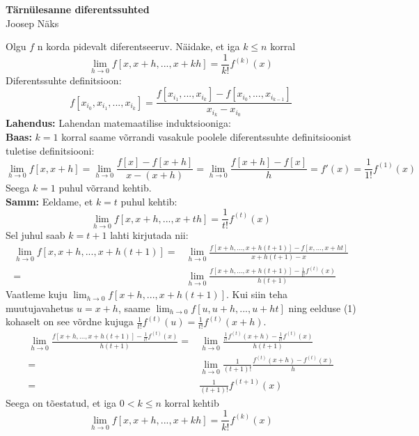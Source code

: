 \documentclass{article}
\begin{document}
\begin{center}
\Large\textbf{T\"arn\"ulesanne diferentssuhted}\\
\small{Joosep N\"aks}
\end{center}
Olgu $f$ n korda pidevalt diferentseeruv. N\"aidake, et iga $k\leq n$ korral\\
\begin {equation*}
\lim_{h\to0} f[x,x+h,...,x+kh]=\frac{1}{k!}f^{(k)}(x)
\end{equation*}
Diferentssuhte definitsioon:
\begin{equation*}
f[x_{i_0},x_{i_1},...,x_{i_k}]=\frac{f[x_{i_1},...,x_{i_k}]-f[x_{i_0},...,x_{i_{k-1}}]}{x_{i_k}-x_{i_0}}
\end{equation*}
\textbf{Lahendus:} Lahendan matemaatilise induktsiooniga:\\
\textbf{Baas:} $k=1$ korral saame v\~orrandi vasakule poolele diferentssuhte definitsioonist tuletise definitsiooni:
\begin{equation*}
\lim_{h\to0} f[x,x+h]=\lim_{h\to0}\frac{f[x]-f[x+h]}{x-(x+h)}=\lim_{h\to0}\frac{f[x+h]-f[x]}{h}=f'(x)=\frac{1}{1!}f^{(1)}(x)
\end{equation*}
Seega $k=1$ puhul v\~orrand kehtib.\\
\textbf{Samm:} Eeldame, et $k=t$ puhul kehtib:
\begin {equation}
\lim_{h\to0} f[x,x+h,...,x+th]=\frac{1}{t!}f^{(t)}(x)
\end{equation}
Sel juhul saab $k=t+1$ lahti kirjutada nii:
\begin {equation*}
\begin{aligned}
\lim_{h\to0} f[x,x+h,...,x+h(t+1)]=&\lim_{h\to0}\frac{f[x+h,...,x+h(t+1)]-f[x,...,x+ht]}{x+h(t+1)-x}\\
=&\lim_{h\to0}\frac{f[x+h,...,x+h(t+1)]-\frac{1}{t!}f^{(t)}(x)}{h(t+1)}
\end{aligned}
\end{equation*}
Vaatleme kuju $\displaystyle\lim_{h\to0}f[x+h,...,x+h(t+1)]$. Kui siin teha muutujavahetus $u=x+h$, saame $\displaystyle\lim_{h\to0}f[u,u+h,...,u+ht]$ ning eelduse (1) kohaselt on see v\~ordne kujuga $\frac{1}{t!}f^{(t)}(u)=\frac{1}{t!}f^{(t)}(x+h)$.
\begin {equation*}
\begin{aligned}
\lim_{h\to0}\frac{f[x+h,...,x+h(t+1)]-\frac{1}{t!}f^{(t)}(x)}{h(t+1)}=&\lim_{h\to0}\frac{\frac{1}{t!}f^{(t)}(x+h)-\frac{1}{t!}f^{(t)}(x)}{h(t+1)}\\
=&\lim_{h\to0}\frac{1}{(t+1)!}\frac{f^{(t)}(x+h)-f^{(t)}(x)}{h}\\
=&\frac{1}{(t+1)!}f^{(t+1)}(x)
\end{aligned}
\end{equation*}
Seega on t\~oestatud, et iga $0<k\leq n$ korral kehtib\\
\begin {equation*}
\lim_{h\to0} f[x,x+h,...,x+kh]=\frac{1}{k!}f^{(k)}(x)
\end{equation*}
\end{document}

